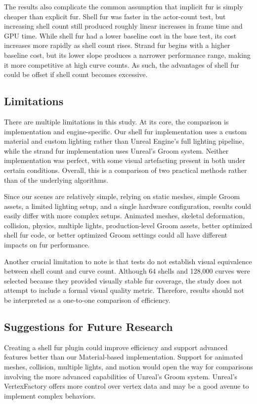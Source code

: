 \documentclass{article}
\begin{document}
The results also complicate the common assumption that implicit fur is simply cheaper than explicit fur. Shell fur was faster in the actor-count test, but increasing shell count still produced roughly linear increases in frame time and GPU time. While shell fur had a lower baseline cost in the base test, its cost increases more rapidly as shell count rises. Strand fur begins with a higher baseline cost, but its lower slope produces a narrower performance range, making it more competitive at high curve counts. As such, the advantages of shell fur could be offset if shell count becomes excessive.

\subsection{Limitations}

There are multiple limitations in this study. At its core, the comparison is implementation and engine-specific. Our shell fur implementation uses a custom material and custom lighting rather than Unreal Engine's full lighting pipeline, while the strand fur implementation uses Unreal's Groom system. Neither implementation was perfect, with some visual artefacting present in both under certain conditions. Overall, this is a comparison of two practical methods rather than of the underlying algorithms. 

Since our scenes are relatively simple, relying on static meshes, simple Groom assets, a limited lighting setup, and a single hardware configuration, results could easily differ with more complex setups. Animated meshes, skeletal deformation, collision, physics, multiple lights, production-level Groom assets, better optimized shell fur code, or better optimized Groom settings could all have different impacts on fur performance.

Another crucial limitation to note is that tests do not establish visual equivalence between shell count and curve count. Although 64 shells and 128,000 curves were selected because they provided visually stable fur coverage, the study does not attempt to include a formal visual quality metric. Therefore, results should not be interpreted as a one-to-one comparison of efficiency.

\subsection{Suggestions for Future Research}

Creating a shell fur plugin could improve efficiency and support advanced features better than our Material-based implementation. Support for animated meshes, collision, multiple lights, and motion would open the way for comparisons involving the more advanced capabilities of Unreal's Groom system. Unreal's VertexFactory offers more control over vertex data and may be a good avenue to implement complex behaviors. 
\end{document}
